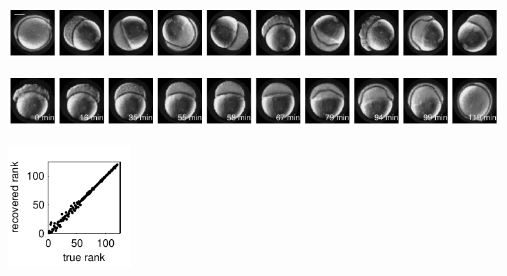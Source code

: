\documentclass[10pt]{article}
\begin{document}
\begin{minipage}[c]{13.75cm}
\vspace{0cm}
\includegraphics[width=13cm]{zebrafish_scrambled}

\includegraphics[width=13cm]{zebrafish_ordered}
\end{minipage}
%
\hfill
%
\begin{minipage}[c]{3.75cm}

\vspace{0cm}
%
\includegraphics[width=3.25cm]{zebrafish_rank_corr}
\end{minipage}
\end{document}
